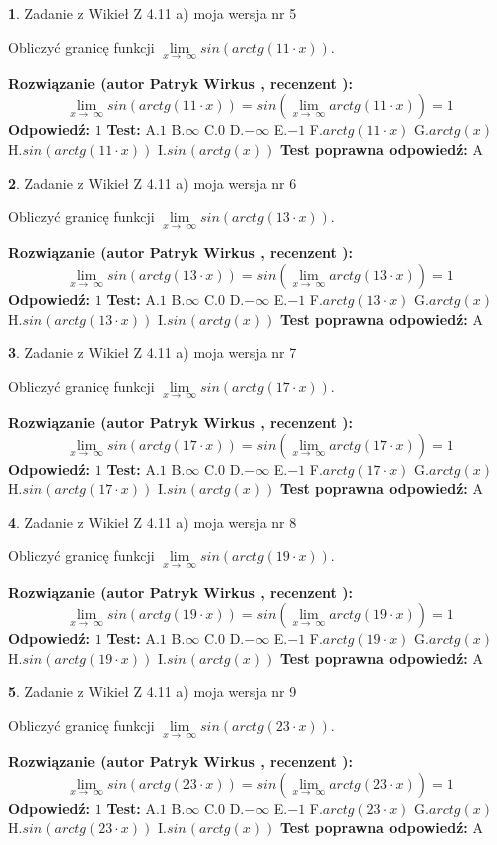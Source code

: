 \documentclass[12pt, a4paper]{article}
\theoremstyle{definition} %
\newtheorem{zad}{}
\newcommand{\zadStart}[1]{\begin{zad}#1\newline}
\newcommand{\zadStop}{\end{zad}}
\newcommand{\rozwStart}[2]{\noindent \textbf{Rozwiązanie (autor #1 , recenzent #2): }\newline}
\newcommand{\rozwStop}{\newline}
\newcommand{\odpStart}{\noindent \textbf{Odpowiedź:}\newline}
\newcommand{\odpStop}{\newline}
\newcommand{\testStart}{\noindent \textbf{Test:}\newline}
\newcommand{\testStop}{\newline}
\newcommand{\kluczStart}{\noindent \textbf{Test poprawna odpowiedź:}\newline}
\newcommand{\kluczStop}{\newline}
\begin{document}
\zadStart{Zadanie z Wikieł Z 4.11 a) moja wersja nr 5}

Obliczyć granicę funkcji  $\lim\limits_{x\to\ \infty}sin(arctg(11\cdot x))$.
\zadStop
\rozwStart{Patryk Wirkus}{}
$$\lim\limits_{x\to\ \infty}sin(arctg(11\cdot x)) = sin(\lim\limits_{x\to\ \infty}arctg(11\cdot x)) = 1$$
\rozwStop
\odpStart
$1$
\odpStop
\testStart
A.$1$ B.$\infty$ C.$0$ D.$-\infty$ E.$-1$
F.$arctg(11\cdot x)$ G.$arctg(x)$
H.$sin(arctg(11\cdot x))$
I.$sin(arctg(x))$
\testStop
\kluczStart
A
\kluczStop



\zadStart{Zadanie z Wikieł Z 4.11 a) moja wersja nr 6}

Obliczyć granicę funkcji  $\lim\limits_{x\to\ \infty}sin(arctg(13\cdot x))$.
\zadStop
\rozwStart{Patryk Wirkus}{}
$$\lim\limits_{x\to\ \infty}sin(arctg(13\cdot x)) = sin(\lim\limits_{x\to\ \infty}arctg(13\cdot x)) = 1$$
\rozwStop
\odpStart
$1$
\odpStop
\testStart
A.$1$ B.$\infty$ C.$0$ D.$-\infty$ E.$-1$
F.$arctg(13\cdot x)$ G.$arctg(x)$
H.$sin(arctg(13\cdot x))$
I.$sin(arctg(x))$
\testStop
\kluczStart
A
\kluczStop



\zadStart{Zadanie z Wikieł Z 4.11 a) moja wersja nr 7}

Obliczyć granicę funkcji  $\lim\limits_{x\to\ \infty}sin(arctg(17\cdot x))$.
\zadStop
\rozwStart{Patryk Wirkus}{}
$$\lim\limits_{x\to\ \infty}sin(arctg(17\cdot x)) = sin(\lim\limits_{x\to\ \infty}arctg(17\cdot x)) = 1$$
\rozwStop
\odpStart
$1$
\odpStop
\testStart
A.$1$ B.$\infty$ C.$0$ D.$-\infty$ E.$-1$
F.$arctg(17\cdot x)$ G.$arctg(x)$
H.$sin(arctg(17\cdot x))$
I.$sin(arctg(x))$
\testStop
\kluczStart
A
\kluczStop



\zadStart{Zadanie z Wikieł Z 4.11 a) moja wersja nr 8}

Obliczyć granicę funkcji  $\lim\limits_{x\to\ \infty}sin(arctg(19\cdot x))$.
\zadStop
\rozwStart{Patryk Wirkus}{}
$$\lim\limits_{x\to\ \infty}sin(arctg(19\cdot x)) = sin(\lim\limits_{x\to\ \infty}arctg(19\cdot x)) = 1$$
\rozwStop
\odpStart
$1$
\odpStop
\testStart
A.$1$ B.$\infty$ C.$0$ D.$-\infty$ E.$-1$
F.$arctg(19\cdot x)$ G.$arctg(x)$
H.$sin(arctg(19\cdot x))$
I.$sin(arctg(x))$
\testStop
\kluczStart
A
\kluczStop



\zadStart{Zadanie z Wikieł Z 4.11 a) moja wersja nr 9}

Obliczyć granicę funkcji  $\lim\limits_{x\to\ \infty}sin(arctg(23\cdot x))$.
\zadStop
\rozwStart{Patryk Wirkus}{}
$$\lim\limits_{x\to\ \infty}sin(arctg(23\cdot x)) = sin(\lim\limits_{x\to\ \infty}arctg(23\cdot x)) = 1$$
\rozwStop
\odpStart
$1$
\odpStop
\testStart
A.$1$ B.$\infty$ C.$0$ D.$-\infty$ E.$-1$
F.$arctg(23\cdot x)$ G.$arctg(x)$
H.$sin(arctg(23\cdot x))$
I.$sin(arctg(x))$
\testStop
\kluczStart
A
\kluczStop
\end{document}
